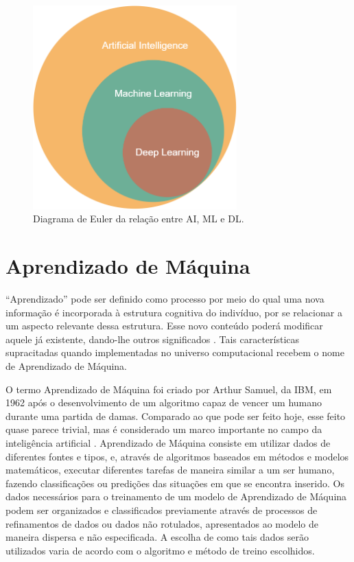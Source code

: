 \begin{figure}[htb]
  \centering
  \caption{\label{fig_euler}Diagrama de Euler da rela{\c c}{\~a}o entre AI, ML e DL.}
  \includegraphics[width=0.7\textwidth]{images/bolas.png}
\end{figure}

\section{Aprendizado de M{\'a}quina}

``Aprendizado'' pode ser definido como processo por meio do qual uma
nova informação é incorporada à estrutura cognitiva do indivíduo, por
se relacionar a um aspecto relevante dessa estrutura. Esse novo
conteúdo poderá modificar aquele já existente, dando-lhe outros
significados \cite{michaelis2022}. Tais características supracitadas
quando implementadas no universo computacional recebem o nome de
Aprendizado de Máquina.

O termo Aprendizado de Máquina foi criado por Arthur Samuel, da IBM,
em 1962 após o desenvolvimento de um algoritmo capaz de vencer um
humano durante uma partida de damas. Comparado ao que pode ser feito
hoje, esse feito quase parece trivial, mas é considerado um marco
importante no campo da inteligência artificial \cite{ibm2022}.
Aprendizado de Máquina consiste em utilizar dados de diferentes fontes
e tipos, e, através de algoritmos baseados em métodos e modelos
matemáticos, executar diferentes tarefas de maneira similar a um ser
humano, fazendo classificações ou predições das situações em que se
encontra inserido.  Os dados necessários para o treinamento de um
modelo de Aprendizado de Máquina podem ser organizados e classificados
previamente através de processos de refinamentos de dados ou dados não
rotulados, apresentados ao modelo de maneira dispersa e não
especificada. A escolha de como tais dados serão utilizados varia de
acordo com o algoritmo e método de treino escolhidos.

